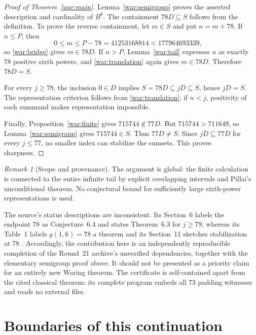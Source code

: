 \documentclass[11pt,a4paper]{article}
\numberwithin{equation}{section}
\theoremstyle{remark}
\newtheorem{remark}[theorem]{Remark}
\begin{document}
\begin{proof}[Proof of Theorem~\ref{war:main}]
Lemma~\ref{war:semigroup} proves the asserted description and cardinality
of $B^6$. The containment $78D\subseteq S$ follows from the definition.
To prove the reverse containment, let $m\in S$ and put $n=m+78$.
If $n\leq P$, then
\[
 0\leq m\leq P-78=41253168814<177964693339,
\]
so \eqref{war:bridge} gives $m\in78D$. If $n>P$,
Lemma~\ref{war:tail} expresses $n$ as exactly $78$ positive sixth powers,
and \eqref{war:translation} again gives $m\in78D$. Therefore $78D=S$.

For every $j\geq78$, the inclusion $0\in D$ implies
$S=78D\subseteq jD\subseteq S$, hence $jD=S$. The representation
criterion follows from \eqref{war:translation}; if $n<j$, positivity of
each summand makes representation impossible.

Finally, Proposition~\ref{war:finite} gives $715744\notin77D$.
But $715744>711649$, so Lemma~\ref{war:semigroup} gives $715744\in S$.
Thus $77D\ne S$. Since $jD\subseteq77D$ for every $j\leq77$, no smaller
index can stabilize the sumsets. This proves sharpness.
\end{proof}

\begin{remark}[Scope and provenance]\label{war:provenance}
The argument is global: the finite calculation is connected to the entire
infinite tail by explicit overlapping intervals and Pillai's unconditional
theorem. No conjectural bound for sufficiently large sixth-power
representations is used.

The source's status descriptions are inconsistent. Its Section~6 labels the
endpoint $78$ as Conjecture~6.4 and states Theorem~6.3 for $j\geq79$,
whereas its Table~1 labels $g(1,6)=78$ a theorem and its Section~11 sketches
stabilization at $78$ \cite{BenfieldLippard}. Accordingly, the contribution
here is an independently reproducible completion of the Round~21 archive's
unverified dependencies, together with the elementary semigroup proof above.
It should not be presented as a priority claim for an entirely new Waring
theorem. The certificate is self-contained apart from the cited classical
theorem: its complete program embeds all $73$ padding witnesses and reads
no external files.
\end{remark}

\section{Boundaries of this continuation}
\label{sec:boundaries}
\end{document}
